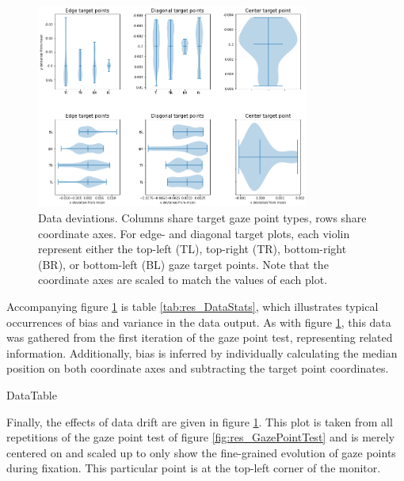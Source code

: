 \begin{figure}[h]
    \centering
    \includegraphics[width=0.8\textwidth]{Images/DataQuality/DataDeviations.png}
    \caption{Data deviations. Columns share target gaze point types, rows share coordinate axes. For edge- and diagonal target plots, each violin represent either the top-left (TL), top-right (TR), bottom-right (BR), or bottom-left (BL) gaze target points. Note that the coordinate axes are scaled to match the values of each plot.}
    \label{fig:res_DataDeviations}
\end{figure}

Accompanying figure \ref{fig:res_DataDeviations} is table \ref{tab:res_DataStats}, which illustrates typical occurrences of bias and variance in the data output. As with figure \ref{fig:res_DataDeviations}, this data was gathered from the first iteration of the gaze point test, representing related information. Additionally, bias is inferred by individually calculating the median position on both coordinate axes and subtracting the target point coordinates.

{DataTable}

Finally, the effects of data drift are given in figure \ref{fig:res_DataDeviations}. This plot is taken from all repetitions of the gaze point test of figure \ref{fig:res_GazePointTest} and is merely centered on and scaled up to only show the fine-grained evolution of gaze points during fixation. This particular point is at the top-left corner of the monitor. 

